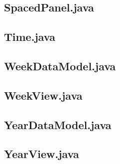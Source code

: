 \documentclass{article}
\begin{document}


\subsection{SpacedPanel.java}



\subsection{Time.java}



\subsection{WeekDataModel.java}



\subsection{WeekView.java}



\subsection{YearDataModel.java}



\subsection{YearView.java}


\end{document}

